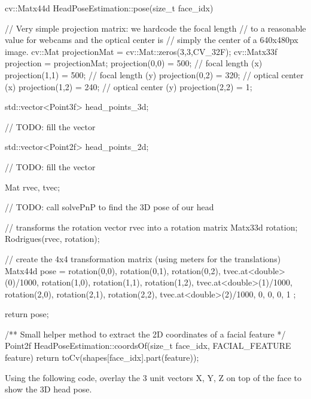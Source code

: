 \documentclass{instructions}
\begin{document}
\begin{cppcode}

cv::Matx44d HeadPoseEstimation::pose(size_t face_idx)
{

    // Very simple projection matrix: we hardcode the focal length
    // to a reasonable value for webcams and the optical center is
    // simply the center of a 640x480px image.
    cv::Mat projectionMat = cv::Mat::zeros(3,3,CV_32F);
    cv::Matx33f projection = projectionMat;
    projection(0,0) = 500; // focal length (x)
    projection(1,1) = 500; // focal length (y)
    projection(0,2) = 320; // optical center (x)
    projection(1,2) = 240; // optical center (y)
    projection(2,2) = 1;

    std::vector<Point3f> head_points_3d;

    // TODO: fill the vector

    std::vector<Point2f> head_points_2d;

    // TODO: fill the vector

    Mat rvec, tvec;

    // TODO: call solvePnP to find the 3D pose of our head

    // transforms the rotation vector rvec into a rotation matrix
    Matx33d rotation;
    Rodrigues(rvec, rotation);


    // create the 4x4 transformation matrix (using meters for the translations)
    Matx44d pose = {
        rotation(0,0),    rotation(0,1),    rotation(0,2),    tvec.at<double>(0)/1000,
        rotation(1,0),    rotation(1,1),    rotation(1,2),    tvec.at<double>(1)/1000,
        rotation(2,0),    rotation(2,1),    rotation(2,2),    tvec.at<double>(2)/1000,
                    0,                0,                0,                          1
    };

    return pose;
}

/** Small helper method to extract the 2D coordinates of a facial feature
 */
Point2f HeadPoseEstimation::coordsOf(size_t face_idx, FACIAL_FEATURE feature)
{
    return toCv(shapes[face_idx].part(feature));
}

\end{cppcode}


Using the following code, overlay the 3 unit vectors X, Y, Z on top of the face
to show the 3D head pose.
\end{document}
